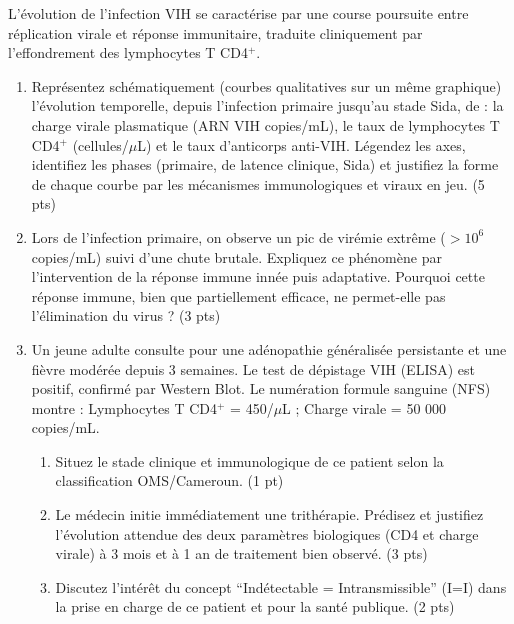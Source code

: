 \documentclass[11pt]{article}
\begin{document}
\begin{exercice}
L'évolution de l'infection VIH se caractérise par une course poursuite entre réplication virale et réponse immunitaire, traduite cliniquement par l'effondrement des lymphocytes T CD4$^+$.
\begin{enumerate}
    \item Représentez schématiquement (courbes qualitatives sur un même graphique) l'évolution temporelle, depuis l'infection primaire jusqu'au stade Sida, de : la charge virale plasmatique (ARN VIH copies/mL), le taux de lymphocytes T CD4$^+$ (cellules/$\mu$L) et le taux d'anticorps anti-VIH. Légendez les axes, identifiez les phases (primaire, de latence clinique, Sida) et justifiez la forme de chaque courbe par les mécanismes immunologiques et viraux en jeu. (5 pts)
    \item Lors de l'infection primaire, on observe un pic de virémie extrême ($> 10^6$ copies/mL) suivi d'une chute brutale. Expliquez ce phénomène par l'intervention de la réponse immune innée puis adaptative. Pourquoi cette réponse immune, bien que partiellement efficace, ne permet-elle pas l'élimination du virus ? (3 pts)
    \item Un jeune adulte consulte pour une adénopathie généralisée persistante et une fièvre modérée depuis 3 semaines. Le test de dépistage VIH (ELISA) est positif, confirmé par Western Blot. Le numération formule sanguine (NFS) montre : Lymphocytes T CD4$^+$ = 450/$\mu$L ; Charge virale = 50 000 copies/mL.
    \begin{enumerate}
        \item Situez le stade clinique et immunologique de ce patient selon la classification OMS/Cameroun. (1 pt)
        \item Le médecin initie immédiatement une trithérapie. Prédisez et justifiez l'évolution attendue des deux paramètres biologiques (CD4 et charge virale) à 3 mois et à 1 an de traitement bien observé. (3 pts)
        \item Discutez l'intérêt du concept ``Indétectable = Intransmissible'' (I=I) dans la prise en charge de ce patient et pour la santé publique. (2 pts)
    \end{enumerate}
\end{enumerate}
\end{exercice}
\end{document}

